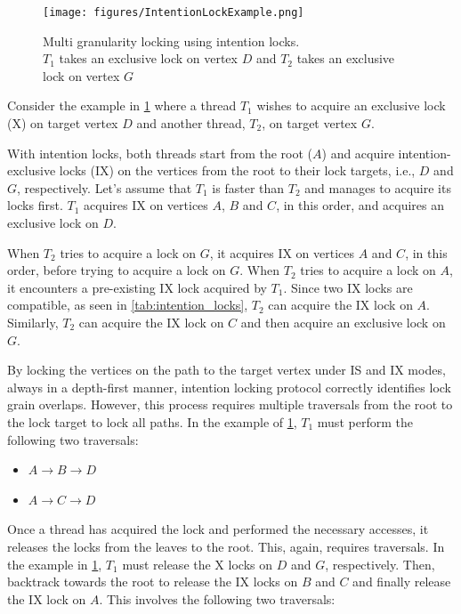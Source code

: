 \begin{figure}[h]
    \centering
    \captionsetup{justification=centering}
    \texttt{[image: figures/IntentionLockExample.png]}
    \caption{Multi granularity locking using intention locks. \\ $T_1$ takes an exclusive lock on vertex $D$ and $T_2$ takes an exclusive lock on vertex $G$ }
    \label{fig:intention_lock_example}
\end{figure}

Consider the example in \cref{fig:intention_lock_example} where a thread $T_1$ wishes to acquire an exclusive lock (X) on target vertex $D$ and another thread, $T_2$, on target vertex $G$. 

With intention locks, both threads start from the root ($A$) and acquire intention-exclusive locks (IX) on the vertices from the root to their lock targets, i.e., $D$ and $G$, respectively. 
Let's assume that $T_1$ is faster than $T_2$ and manages to acquire its locks first. 
$T_1$ acquires IX on vertices $A$, $B$ and $C$, in this order, and acquires an exclusive lock on $D$. 

When $T_2$ tries to acquire a lock on $G$, it acquires IX on vertices $A$ and $C$, in this order, before trying to acquire a lock on $G$. 
When $T_2$ tries to acquire a lock on $A$, it encounters a pre-existing  IX lock acquired by $T_1$. 
Since two IX locks are compatible, as seen in \cref{tab:intention_locks}, $T_2$ can acquire the IX lock on $A$.
Similarly, $T_2$ can acquire the IX lock on $C$ and then acquire an exclusive lock on $G$.


By locking the vertices on the path to the target vertex under IS and IX modes, always in a depth-first manner, 
intention locking protocol correctly identifies lock grain overlaps. 
However, this process requires multiple traversals from the root to the lock target to lock all paths. 
In the example of \cref{fig:intention_lock_example}, $T_1$ must perform the following two traversals:

\begin{itemize}
    \item $A \rightarrow B \rightarrow D$
    \item $A \rightarrow C \rightarrow D$
\end{itemize}

Once a thread has acquired the lock and performed the necessary accesses, it releases the locks from the leaves to the root. This, again, requires traversals. In the example in \cref{fig:intention_lock_example}, $T_1$ must release the X locks on $D$ and $G$, respectively. Then, backtrack towards the root to release the IX locks on $B$ and $C$ and finally release the IX lock on $A$. This involves the following two traversals:

